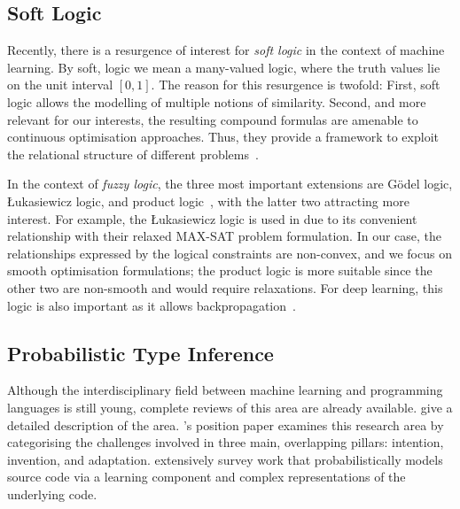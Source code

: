 \documentclass[acmsmall, review, anonymous]{acmart}\settopmatter{printfolios=true,printccs=false,printacmref=false}
\begin{document}
 
\subsection{Soft Logic}\label{ssec:softlogic}

Recently, there is a resurgence of interest for \textit{soft logic} in the context of machine learning. By soft, logic we mean a many-valued logic, where the truth values lie on the unit interval $[0,1]$. The 
reason for this resurgence is twofold: First,
soft logic allows the modelling of multiple notions
of similarity. Second, and more relevant for our
interests, the resulting compound formulas are 
amenable to continuous optimisation approaches. Thus, they provide a framework to exploit the relational structure of different problems~\cite{kimmig12}.

In the context of \textit{fuzzy logic}, the three most
important extensions are G{\"o}del logic, {\L}ukasiewicz logic, and product logic~\cite{hajek98}, with the latter two attracting more interest. For example, the {\L}ukasiewicz logic is used in \citet{bach17} due 
to its convenient relationship with their relaxed MAX-SAT problem formulation. In our case, the relationships expressed by the logical constraints are non-convex, and we focus on smooth optimisation formulations; the product logic is more
suitable since the other two are non-smooth and 
would require relaxations. For 
deep learning, this logic is also important as it 
allows backpropagation~\cite{evans18}.

\subsection{Probabilistic Type Inference}\label{sec:ml:over:source}

Although the interdisciplinary field between machine learning and programming
languages is still young, complete reviews of this area are
already available.
\citet{vechev16} give a detailed description of the area.
\citet{threepillars}'s position paper examines this research area by categorising
the challenges involved in three main, overlapping pillars: intention, invention, and adaptation.
\citet{allamanis17} extensively survey work that probabilistically models source code via a learning component and complex representations of the underlying code.
\end{document}
